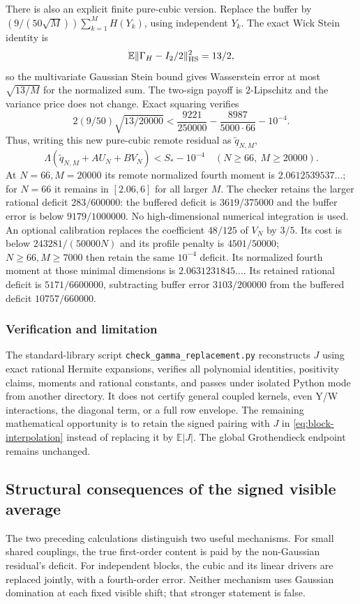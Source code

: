 There is also an explicit finite pure-cubic version. Replace the buffer
by $(9/(50\sqrt M))\sum_{k=1}^M H(Y_k)$, using independent $Y_k$.
The exact Wick Stein identity is
\[
 \mathbb E\|\Gamma_H-I_2/2\|_{\rm HS}^2=13/2,
\]
so the multivariate Gaussian Stein bound gives Wasserstein error at most
$\sqrt{13/M}$ for the normalized sum. The two-sign payoff is
$2$-Lipschitz and the variance price does not change. Exact squaring
verifies
\[
 2(9/50)\sqrt{13/20000}
 <\frac{9221}{250000}-\frac{8987}{5000\cdot66}-10^{-4}.
\]
Thus, writing this new pure-cubic remote residual as
$\widetilde q_{N,M}$,
\[
 \boxed{\Lambda(\widetilde q_{N,M}+AU_N+BV_N)<S_*-10^{-4}
                  \quad(N\ge66,\ M\ge20000).}
\]
At $N=66,M=20000$ its remote normalized fourth moment is
$2.0612539537\ldots$; for $N=66$ it remains in $[2.06,6]$ for all
larger $M$. The checker retains the larger rational deficit
$283/600000$: the buffered deficit is $3619/375000$ and the buffer
error is below $9179/1000000$. No high-dimensional numerical integration is used.
An optional calibration replaces the coefficient $48/125$ of $V_N$
by $3/5$. Its cost is below $243281/(50000N)$ and its profile penalty
is $4501/50000$; $N\ge66,M\ge7000$ then retain the same $10^{-4}$
deficit. Its normalized fourth moment at those minimal dimensions is
$2.0631231845\ldots$. Its retained rational deficit is
$5171/6600000$, subtracting buffer error $3103/200000$ from the
buffered deficit $10757/660000$.

\subsubsection{Verification and limitation}
The standard-library script \texttt{check\_gamma\_replacement.py}
reconstructs $J$ using exact rational Hermite expansions, verifies all
polynomial identities, positivity claims, moments and rational
constants, and passes under isolated Python mode from another
directory. It does not certify general coupled kernels, even Y/W
interactions, the diagonal term, or a full row envelope. The remaining
mathematical opportunity is to retain the signed pairing with $J$ in
\eqref{eq:block-interpolation} instead of replacing it by
$\mathbb E|J|$. The global Grothendieck endpoint remains unchanged.


\subsection{Structural consequences of the signed visible average}
\label{sec:signed-structural-ab}
The two preceding calculations distinguish two useful mechanisms.
For small shared couplings, the true first-order content is paid by the
non-Gaussian residual's deficit. For independent blocks, the cubic and
its linear drivers are replaced jointly, with a fourth-order error.
Neither mechanism uses Gaussian domination at each fixed visible shift;
that stronger statement is false.

